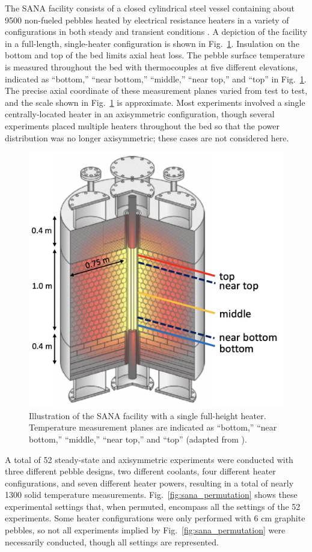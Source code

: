 The SANA facility consists of a closed cylindrical steel vessel containing about 9500 non-fueled pebbles heated by electrical resistance heaters in a variety of configurations in both steady and transient conditions \cite{SANA}. A depiction of the facility in a full-length, single-heater configuration is shown in Fig.\ \ref{fig:SANA_core}. Insulation on the bottom and top of the bed limits axial heat loss. The pebble surface temperature is measured throughout the bed with thermocouples at five different elevations, indicated as ``bottom,'' ``near bottom,'' ``middle,'' ``near top,'' and ``top'' in Fig.\ \ref{fig:SANA_core}. The precise axial coordinate of these measurement planes varied from test to test, and the scale shown in Fig.\ \ref{fig:SANA_core} is approximate. Most experiments involved a single centrally-located heater in an axisymmetric configuration, though several experiments placed multiple heaters throughout the bed so that the power distribution was no longer axisymmetric; these cases are not considered here.

\begin{figure}[h!]
\centering
\hspace{1.3cm}
\includegraphics[width=0.5\linewidth]{figs/sana_core_labeled.png}
\caption{Illustration of the SANA facility with a single full-height heater. Temperature measurement planes are indicated as ``bottom,'' ``near bottom,'' ``middle,'' ``near top,'' and ``top'' (adapted from \cite{SANA}).}
\label{fig:SANA_core}
\end{figure}

A total of 52 steady-state and axisymmetric experiments were conducted with three different pebble designs, two different coolants, four different heater configurations, and seven different heater powers, resulting in a total of nearly 1300 solid temperature measurements. Fig.\ \ref{fig:sana_permutation} shows these experimental settings that, when permuted, encompass all the settings of the 52 experiments. Some heater configurations were only performed with 6 \si{\centi\meter} graphite pebbles, so not all experiments implied by Fig.\ \ref{fig:sana_permutation} were necessarily conducted, though all settings are represented.

